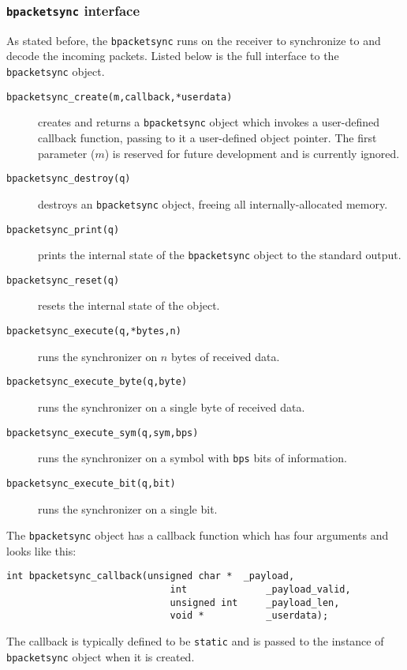 \subsubsection{{\tt bpacketsync} interface}
\label{module:framing:bpacket:bpacketsync}
As stated before, the {\tt bpacketsync} runs on the receiver to
synchronize to and decode the incoming packets.
Listed below is the full interface to the {\tt bpacketsync} object.
%
\begin{description}
\item[{\tt bpacketsync\_create(m,callback,*userdata)}]
    creates and returns a {\tt bpacketsync} object which invokes a
    user-defined callback function, passing to it a user-defined object
    pointer.
    The first parameter ($m$) is reserved for future development and is
    currently ignored.
\item[{\tt bpacketsync\_destroy(q)}]
    destroys an {\tt bpacketsync} object, freeing all
    internally-allocated memory.
\item[{\tt bpacketsync\_print(q)}]
    prints the internal state of the {\tt bpacketsync} object to the
    standard output.
\item[{\tt bpacketsync\_reset(q)}]
    resets the internal state of the object.
\item[{\tt bpacketsync\_execute(q,*bytes,n)}]
    runs the synchronizer on $n$ bytes of received data.
\item[{\tt bpacketsync\_execute\_byte(q,byte)}]
    runs the synchronizer on a single byte of received data.
\item[{\tt bpacketsync\_execute\_sym(q,sym,bps)}]
    runs the synchronizer on a symbol with {\tt bps} bits of
    information.
\item[{\tt bpacketsync\_execute\_bit(q,bit)}]
    runs the synchronizer on a single bit.
\end{description}
%
The {\tt bpacketsync} object has a callback function which has four
arguments and looks like this:
%
\begin{Verbatim}[fontsize=\small]
    int bpacketsync_callback(unsigned char *  _payload,
                             int              _payload_valid,
                             unsigned int     _payload_len,
                             void *           _userdata);
\end{Verbatim}
%
The callback is typically defined to be {\tt static} and is passed to
the instance of {\tt bpacketsync} object when it is created.
